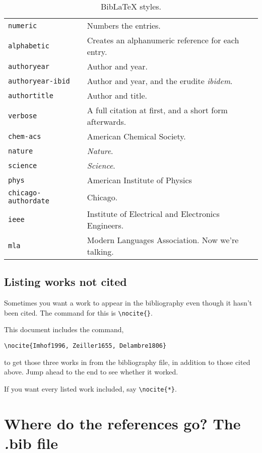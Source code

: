 \begin{table}[htp]
\caption{BibLaTeX styles.}
\label{tab:biblatex-styles}
\centering
\begin{tabular}{lp{10cm}}
\toprule
\texttt{numeric} & Numbers the entries. \\
\texttt{alphabetic} & Creates an alphanumeric reference for each entry. \\
\texttt{authoryear} 
	& Author and year. \\
\texttt{authoryear-ibid}
	& Author and year, and the erudite \emph{ibidem}. \\
\texttt{authortitle}
	& Author and title. \\
\texttt{verbose} 
	& A full citation at first, and a short form afterwards. \\
\texttt{chem-acs}
	& American Chemical Society. \\
\texttt{nature}
	& \emph{Nature}.\\	
\texttt{science}
	& \emph{Science}.\\	
\texttt{phys}
	& American Institute of Physics\\	
\texttt{chicago-authordate}
	& Chicago. \\	
\texttt{ieee}
	& Institute of Electrical and Electronics Engineers.\\	
\texttt{mla}
	& Modern Languages Association. Now we're talking.\\
\bottomrule
\end{tabular}
\end{table}

\subsection{Listing works not cited}
Sometimes you want a work to appear in the bibliography even though it hasn't been cited.  The command for this is \verb+\nocite{}+.

This document includes the command, 

\quad\quad \verb+\nocite{Imhof1996, Zeiller1655, Delambre1806}+ 

\noindent to get those three works in from the bibliography file, in addition to those cited above.  Jump ahead to the end to see whether it worked.

If you want every listed work included, say \verb+\nocite{*}+.  

\nocite{Imhof1996, Zeiller1655, Delambre1806}

\section{Where do the references go? The \emph.{bib} file}

